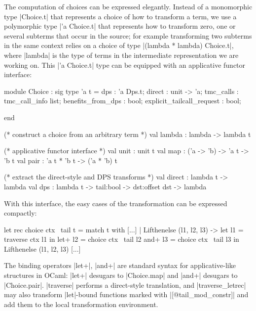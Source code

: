 The computation of choices can be expressed elegantly. Instead of a monomorphic type \ocaml|Choice.t| that represents a choice of how to transform a term, we use a polymorphic type \ocaml|'a Choice.t| that represents how to transform zero, one or several subterms that occur in the source; for example transforming two subterms in the same context relies on a choice of type \ocaml|(lambda * lambda) Choice.t|, where \ocaml|lambda| is the type of terms in the intermediate representation we are working on. This \ocaml|'a Choice.t| type can be equipped with an applicative functor interface:

\begin{minipage}{0.4\linewidth}
\begin{Ocaml}
module Choice : sig
  type 'a t = {
    dps : 'a Dps.t;
    direct : unit -> 'a;
    tmc_calls : tmc_call_info list;
    benefits_from_dps : bool;
    explicit_tailcall_request : bool;
  }





end
\end{Ocaml}
\end{minipage}
\hfill
\begin{minipage}{0.5\linewidth}
\begin{Ocaml}
  (* construct a choice from an arbitrary term *)
  val lambda : lambda -> lambda t

  (* applicative functor interface *)
  val unit : unit t
  val map : ('a -> 'b) -> 'a t -> 'b t
  val pair : 'a t * 'b t -> ('a * 'b) t

  (* extract the direct-style and DPS transforms *)
  val direct : lambda t -> lambda
  val dps :
    lambda t -> tail:bool -> dst:offset dst ->
    lambda
\end{Ocaml}
\end{minipage}

With this interface, the easy cases of the transformation can be expressed compactly:
\begin{Ocaml}
  let rec choice ctx ~tail t =
    match t with
    [...]
    | Lifthenelse (l1, l2, l3) ->
        let l1 = traverse ctx l1 in
        let+ l2 = choice ctx ~tail l2
        and+ l3 = choice ctx ~tail l3
        in Lifthenelse (l1, l2, l3)
    [...]
\end{Ocaml}
The binding operators \ocaml|let+|, \ocaml|and+| are standard syntax for applicative-like structures in OCaml: \ocaml|let+| desugars to \ocaml|Choice.map| and \ocaml|and+| desugars to \ocaml|Choice.pair|. \ocaml|traverse| performs a direct-style translation, and \ocaml|traverse_letrec| may also transform \ocaml|let|-bound functions marked with \ocaml|[@tail_mod_constr]| and add them to the local transformation environment.

